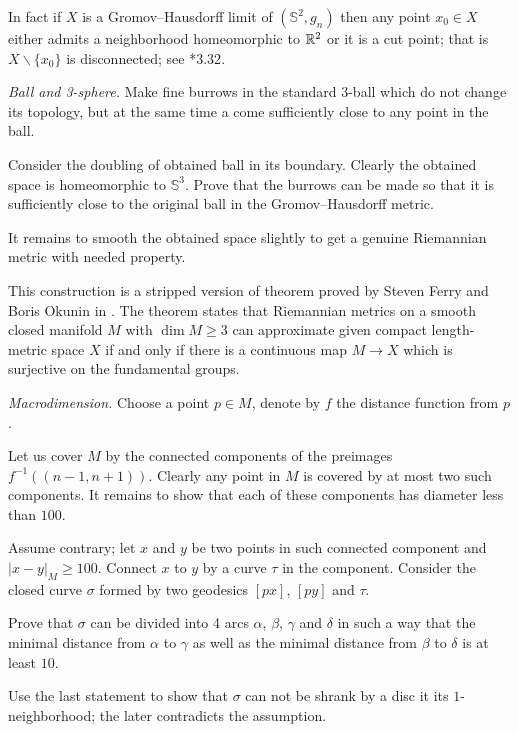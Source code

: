 In fact if $X$ is a Gromov--Hausdorff limit of $(\mathbb{S}^2,g_n)$
then any point $x_0\in X$ either admits a neighborhood homeomorphic to $\mathbb{R}^2$ or it is a cut point;
that is $X\backslash\{x_0\}$ is disconnected; see \cite{gromov-MetStr}*{3.32}.

\textit{Ball and 3-sphere.}
Make fine burrows in the standard 3-ball which do not change its topology,
but at the same time a come sufficiently close to any point in the ball.

Consider the doubling of obtained ball in its boundary.
Clearly the obtained space is homeomorphic to $\mathbb{S}^3$.
Prove that the burrows can be made 
so that it is sufficiently close to the original ball 
in the Gromov--Hausdorff metric.

It remains to smooth the obtained space slightly 
to get a genuine Riemannian metric with needed property.

This construction is a stripped version of theorem proved by Steven Ferry and Boris Okunin in \cite{ferry-okun}.
The theorem states that Riemannian metrics on a smooth closed manifold $M$ with $\dim M\ge 3$ 
can approximate given compact length-metric space $X$ 
if and only if 
there is a continuous map $M\to X$
which is surjective on the fundamental groups. 

\textit{Macrodimension.}
Choose a point $p\in M$,
denote by $f$ the distance function from $p$.

Let us cover $M$ by the connected components of the preimages 
$f^{-1}((n-1,n+1))$.
Clearly any point in $M$ is covered by at most two such components.
It remains to show that each of these components has diameter less than $100$.

Assume contrary; let $x$ and $y$ be two points in such connected component 
and $|x-y|_M\ge 100$.
Connect $x$ to $y$ by a curve $\tau$ in the component.
Consider the closed curve $\sigma$ formed by two geodesics $[px]$, $[py]$ and $\tau$.

Prove that $\sigma$ can be divided into 4 arcs $\alpha$, $\beta$, $\gamma$ and $\delta$
in such a way that the minimal distance from $\alpha$ to $\gamma$ as well as the minimal distance from $\beta$ to $\delta$ is at least $10$.

Use the last statement to show that $\sigma$ 
can not be shrank 
by a disc it its $1$-neighborhood;
the later contradicts the assumption.

